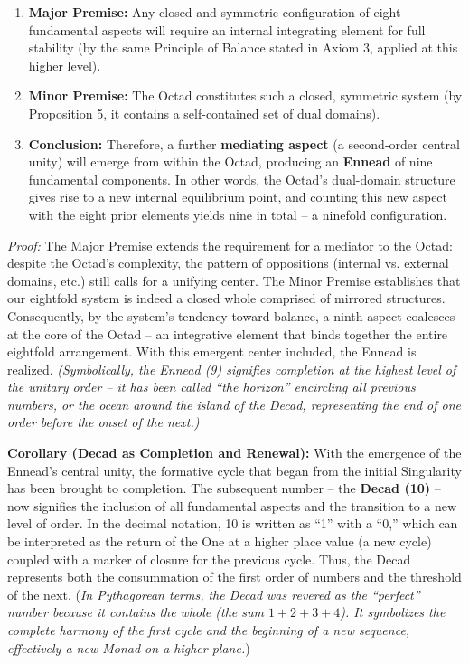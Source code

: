 \documentclass[11pt]{article}
\theoremstyle{plain}
\begin{document}
\begin{enumerate}
    \item \textbf{Major Premise:} Any closed and symmetric configuration of eight fundamental aspects will require an internal integrating element for full stability (by the same Principle of Balance stated in Axiom 3, applied at this higher level).
    \item \textbf{Minor Premise:} The Octad constitutes such a closed, symmetric system (by Proposition 5, it contains a self-contained set of dual domains).
    \item \textbf{Conclusion:} Therefore, a further \textbf{mediating aspect} (a second-order central unity) will emerge from within the Octad, producing an \textbf{Ennead} of nine fundamental components. In other words, the Octad’s dual-domain structure gives rise to a new internal equilibrium point, and counting this new aspect with the eight prior elements yields nine in total – a ninefold configuration.
\end{enumerate}

\textit{Proof:} The Major Premise extends the requirement for a mediator to the Octad: despite the Octad’s complexity, the pattern of oppositions (internal vs. external domains, etc.) still calls for a unifying center. The Minor Premise establishes that our eightfold system is indeed a closed whole comprised of mirrored structures. Consequently, by the system’s tendency toward balance, a ninth aspect coalesces at the core of the Octad – an integrative element that binds together the entire eightfold arrangement. With this emergent center included, the Ennead is realized. \textit{(Symbolically, the Ennead (9) signifies completion at the highest level of the unitary order – it has been called “the horizon” encircling all previous numbers, or the ocean around the island of the Decad, representing the end of one order before the onset of the next.)}

\textbf{Corollary (Decad as Completion and Renewal):} With the emergence of the Ennead’s central unity, the formative cycle that began from the initial Singularity has been brought to completion. The subsequent number – the \textbf{Decad (10)} – now signifies the inclusion of all fundamental aspects and the transition to a new level of order. In the decimal notation, 10 is written as “1” with a “0,” which can be interpreted as the return of the One at a higher place value (a new cycle) coupled with a marker of closure for the previous cycle. Thus, the Decad represents both the consummation of the first order of numbers and the threshold of the next. (\textit{In Pythagorean terms, the Decad was revered as the “perfect” number because it contains the whole (the sum $1+2+3+4$). It symbolizes the complete harmony of the first cycle and the beginning of a new sequence, effectively a new Monad on a higher plane.})
\end{document}
